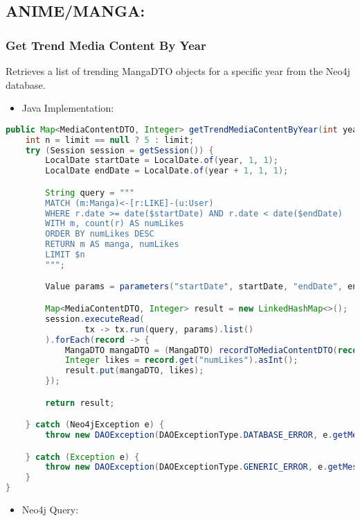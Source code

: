 \subsection*{ANIME/MANGA:}
\subsubsection*{Get Trend Media Content By Year}

Retrieves a list of trending MangaDTO objects for a specific year from the Neo4j database.
\begin{itemize}
    \item Java Implementation:
\end{itemize}

\begin{mdframed}[style=customstyle]
\begin{lstlisting}[language=java]
public Map<MediaContentDTO, Integer> getTrendMediaContentByYear(int year, Integer limit) throws DAOException {
    int n = limit == null ? 5 : limit;
    try (Session session = getSession()) {
        LocalDate startDate = LocalDate.of(year, 1, 1);
        LocalDate endDate = LocalDate.of(year + 1, 1, 1);

        String query = """
        MATCH (m:Manga)<-[r:LIKE]-(u:User)
        WHERE r.date >= date($startDate) AND r.date < date($endDate)
        WITH m, count(r) AS numLikes
        ORDER BY numLikes DESC
        RETURN m AS manga, numLikes
        LIMIT $n
        """;

        Value params = parameters("startDate", startDate, "endDate", endDate, "n", n);

        Map<MediaContentDTO, Integer> result = new LinkedHashMap<>();
        session.executeRead(
                tx -> tx.run(query, params).list()
        ).forEach(record -> {
            MangaDTO mangaDTO = (MangaDTO) recordToMediaContentDTO(record);
            Integer likes = record.get("numLikes").asInt();
            result.put(mangaDTO, likes);
        });

        return result;

    } catch (Neo4jException e) {
        throw new DAOException(DAOExceptionType.DATABASE_ERROR, e.getMessage());

    } catch (Exception e) {
        throw new DAOException(DAOExceptionType.GENERIC_ERROR, e.getMessage());
    }
}\end{lstlisting}
\end{mdframed}

\begin{itemize}
    \item Neo4j Query:
\end{itemize}

